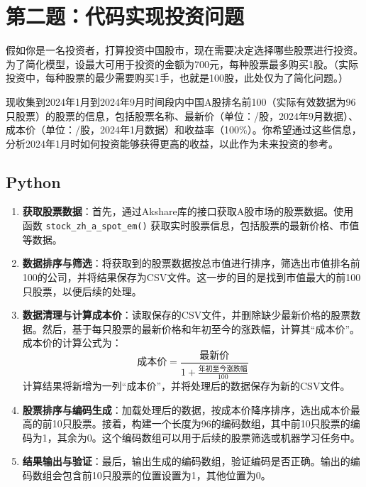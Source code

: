 \documentclass[journal,twoside,web]{ieeecolor}
\begin{document}
\section{第二题：代码实现投资问题}
假如你是一名投资者，打算投资中国股市，现在需要决定选择哪些股票进行投资。为了简化模型，设最大可用于投资的金额为700元，每种股票最多购买1股。（实际投资中，每种股票的最少需要购买1手，也就是100股，此处仅为了简化问题。）

现收集到2024年1月到2024年9月时间段内中国A股排名前100（实际有效数据为96只股票）的股票的信息，包括股票名称、最新价（单位：/股，2024年9月数据）、成本价（单位：/股，2024年1月数据）和收益率（100\%）。你希望通过这些信息，分析2024年1月时如何投资能够获得更高的收益，以此作为未来投资的参考。
\subsection{Python}
\begin{enumerate}
    \item \textbf{获取股票数据}：首先，通过Akshare库的接口获取A股市场的股票数据。使用函数 \texttt{stock\_zh\_a\_spot\_em()} 获取实时股票信息，包括股票的最新价格、市值等数据。
    
    \item \textbf{数据排序与筛选}：将获取到的股票数据按总市值进行排序，筛选出市值排名前100的公司，并将结果保存为CSV文件。这一步的目的是找到市值最大的前100只股票，以便后续的处理。
    
    \item \textbf{数据清理与计算成本价}：读取保存的CSV文件，并删除缺少最新价格的股票数据。然后，基于每只股票的最新价格和年初至今的涨跌幅，计算其“成本价”。成本价的计算公式为：
    \[
    \text{成本价} = \frac{\text{最新价}}{1 + \frac{\text{年初至今涨跌幅}}{100}}
    \]
    计算结果将新增为一列“成本价”，并将处理后的数据保存为新的CSV文件。
    
    \item \textbf{股票排序与编码生成}：加载处理后的数据，按成本价降序排序，选出成本价最高的前10只股票。接着，构建一个长度为96的编码数组，其中前10只股票的编码为1，其余为0。这个编码数组可以用于后续的股票筛选或机器学习任务中。
    
    \item \textbf{结果输出与验证}：最后，输出生成的编码数组，验证编码是否正确。输出的编码数组会包含前10只股票的位置设置为1，其他位置为0。
\end{enumerate}
\end{document}

